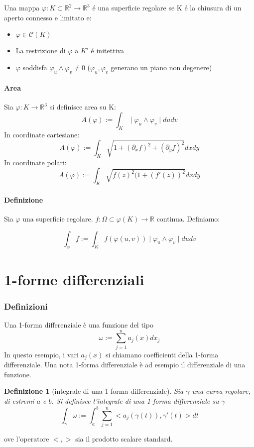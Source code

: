 \documentclass[a4paper,12pt]{article}
\newcommand{\cont}{\mathscr{C}}
\newtheorem{defi}{Definizione}
\begin{document}
Una mappa $\varphi :K \subset \mathbb{R}^2 \rightarrow \mathbb{R}^3$ \'{e} una superficie regolare se K \'{e} la chiusura di un aperto connesso e limitato e:

\begin{itemize}
 \item $\varphi \in \cont (K)$
 \item La restrizione di $\varphi$ a $K^i$ \'{e} initettiva
 \item $\varphi$ soddisfa $\varphi_u \land \varphi_v \neq 0$ ($\varphi_u , \varphi_v $ generano un piano non degenere)
\end{itemize}


\paragraph{Area}

Sia $\varphi :K \rightarrow \mathbb{R}^3$ si definisce area su K:
$$A(\varphi) := \int_K \mid \varphi_u \land \varphi_v \mid dudv$$
In coordinate cartesiane:
$$A(\varphi) := \int_K \sqrt{1+(\partial_x f)^2+(\partial_y f)^2} dxdy$$
In coordinate polari:
$$A(\varphi) := \int_K \sqrt{f(z)^2(1+(f'(z))^2} dxdy$$

\paragraph{Definizione}

Sia $\varphi$ una superficie regolare. $f: \Omega \subset \varphi(K) \rightarrow \mathbb{R}$ continua. Definiamo:

$$\int_\varphi f := \int_K f(\varphi(u,v)) \mid \varphi_u \land \varphi_v \mid dudv$$
 

\section{1-forme differenziali}
\subsubsection{Definizioni}
Una 1-forma differenziale è una funzione del tipo
$$\omega := \sum_{j=1}^n a_j(x)dx_j$$
In questo esempio, i vari $a_j(x)$ si chiamano coefficienti della 1-forma differenziale.
Una nota 1-forma differenziale è ad esempio il differenziale di una funzione.
\begin{defi}[integrale di una 1-forma differenziale]
Sia $\gamma$ una curva regolare, di estremi $a$ e $b$.
Si definisce l'integrale di una 1-forma differenziale su $\gamma$
$$\int_\gamma \omega:=\int_a^b \sum_{j=1}^n <a_j(\gamma(t)), \gamma'(t)> dt$$
\end{defi}
ove l'operatore $<,>$ sia il prodotto scalare standard.
\end{document}
